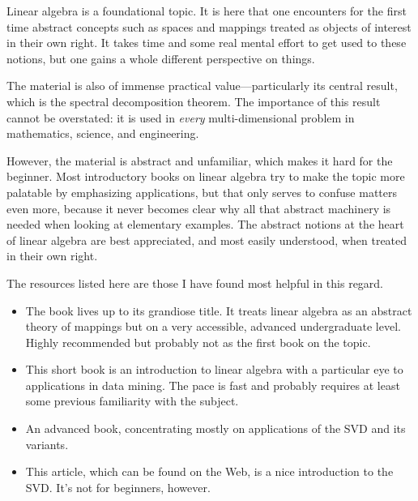 Linear algebra is a foundational topic. It is here that one encounters
for the first time abstract concepts such as spaces and mappings
treated as objects of interest in their own right. It takes time and
some real mental effort to get used to these notions, but one gains a
whole different perspective on things.

The material is also of immense practical value---particularly its
central result, which is the spectral decomposition theorem.  The
importance of this result cannot be overstated: it is used in
\emph{every} multi-dimensional problem in mathematics, science, and
engineering.

However, the material is abstract and unfamiliar, which makes it hard
for the beginner. Most introductory books on linear algebra try to
make the topic more palatable by emphasizing applications, but that
only serves to confuse matters even more, because it never becomes
clear why all that abstract machinery is needed when looking at
elementary examples. The abstract notions at the heart of linear
algebra are best appreciated, and most easily understood, when treated
in their own right.

The resources listed here are those I have found most helpful in this
regard.

\begin{itemize}

\item {}
  The book lives up to its grandiose title. It treats linear algebra
  as an abstract theory of mappings but on a very accessible, advanced
  undergraduate level. Highly recommended but probably not as the first
  book on the topic.

\item {} 
  This short book is an introduction to linear algebra with a
  particular eye to applications in data mining. The pace is fast and
  probably requires at least some previous familiarity with the
  subject.

\item {}
  An advanced book, concentrating mostly on applications of the SVD
  and its variants.

\item {}
  This article, which can be found on the Web, is a nice introduction
  to the SVD. It's not for beginners, however.
\end{itemize}


\clearpage

\thispagestyle{empty}

\cleardoublepage
